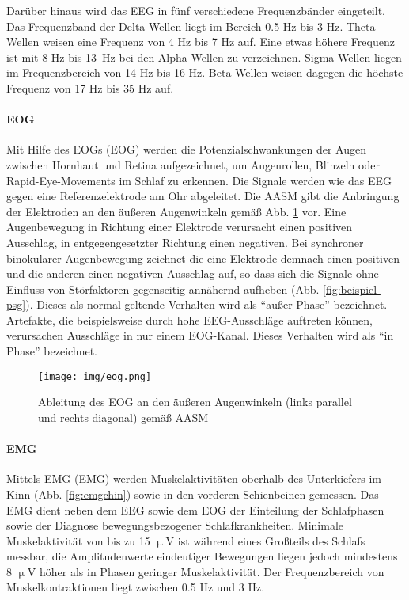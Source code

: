 Darüber hinaus wird das \acs{EEG} in fünf verschiedene Frequenzbänder eingeteilt. Das Frequenzband der Delta-Wellen liegt im Bereich 0.5 Hz bis 3 Hz. Theta-Wellen weisen eine Frequenz von 4 Hz bis 7 Hz auf. Eine etwas höhere Frequenz ist mit 8 Hz bis 13~Hz bei den Alpha-Wellen zu verzeichnen. Sigma-Wellen liegen im Frequenzbereich von 14 Hz bis 16 Hz. Beta-Wellen weisen dagegen die höchste Frequenz von 17 Hz bis 35 Hz auf. \parencite{lee-chiong_sleep_2008, steinberg_schlafmedizin_2010}\\

\paragraph{\acs{EOG}}
Mit Hilfe des \acl{EOG}s (\acs{EOG}) werden die Potenzialschwankungen der Augen zwischen Hornhaut und Retina aufgezeichnet, um Augenrollen, Blinzeln oder Rapid-Eye-Movements im Schlaf zu erkennen. Die Signale werden wie das \acs{EEG} gegen eine Referenzelektrode am Ohr abgeleitet. Die \acs{AASM} gibt die Anbringung der Elektroden an den äußeren Augenwinkeln gemäß Abb. \ref{fig:eog} vor. Eine Augenbewegung in Richtung einer Elektrode verursacht einen positiven Ausschlag, in entgegengesetzter Richtung einen negativen. Bei synchroner binokularer Augenbewegung zeichnet die eine Elektrode demnach einen positiven und die anderen einen negativen Ausschlag auf, so dass sich die Signale ohne Einfluss von Störfaktoren gegenseitig annähernd aufheben (Abb. \ref{fig:beispiel-psg}). Dieses als normal geltende Verhalten wird als "`außer Phase"' bezeichnet. Artefakte, die beispielsweise durch hohe \acs{EEG}-Ausschläge auftreten können, verursachen Ausschläge in nur einem \acs{EOG}-Kanal. Dieses Verhalten wird als "`in Phase"' bezeichnet. \parencite{iber_aasm_2007, lee-chiong_sleep_2008}

\begin{figure}[H]
	\centering
	\texttt{[image: img/eog.png]}
	\caption[Elektrodenpositionen des \acs{EOG}]{Ableitung des \acs{EOG} an den äußeren Augenwinkeln (links parallel und rechts diagonal) gemäß \acs{AASM} \parencite{iber_aasm_2007}}
	\label{fig:eog}
\end{figure}

\paragraph{\acs{EMG}}
Mittels \acl{EMG} (\acs{EMG}) werden Muskelaktivitäten oberhalb des Unterkiefers im Kinn (Abb. \ref{fig:emgchin}) sowie in den vorderen Schienbeinen gemessen. Das \acs{EMG} dient neben dem \acs{EEG} sowie dem \acs{EOG} der Einteilung der Schlafphasen sowie der Diagnose bewegungsbezogener Schlafkrankheiten. Minimale Muskelaktivität von bis zu 15 $\upmu$V ist während eines Großteils des Schlafs messbar, die Amplitudenwerte eindeutiger Bewegungen liegen jedoch mindestens 8 $\upmu$V höher als in Phasen geringer Muskelaktivität. Der Frequenzbereich von Muskelkontraktionen liegt zwischen 0.5 Hz und 3 Hz. \parencite{iber_aasm_2007, leroux_handbuch_2009, lee-chiong_sleep_2008}


